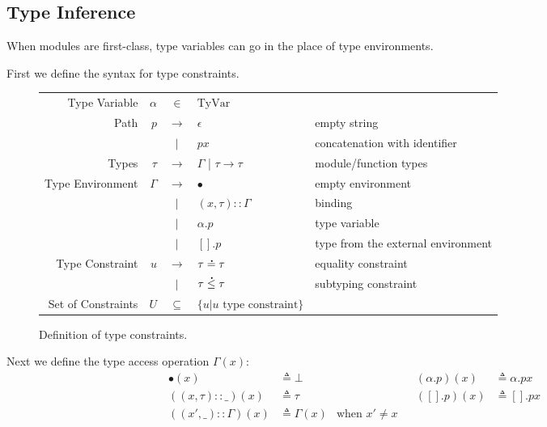 \documentclass{article}
\theoremstyle{definition}
\newcommand*{\vbar}{|}
\newcommand*{\cons}{::}
\newcommand*{\A}[1]{\overset{\,_{\mbox{\Large .}}}{#1}}
\newcommand*{\TyVar}{\text{TyVar}}
\begin{document}
\subsection{Type Inference}

When modules are first-class, type variables can go in the place of type environments.

First we define the syntax for type constraints.
\begin{figure}[h!]
  \centering
  \begin{tabular}{rrcll}
    Type Variable      & $\alpha$ & $\in$         & $\TyVar$                                                              \\
    Path               & $p$      & $\rightarrow$ & $\epsilon$                       & empty string                       \\
                       &          & $\vbar$       & $p x$                            & concatenation with identifier      \\
    Types              & $\tau$   & $\rightarrow$ & $\Gamma$ | $\tau\rightarrow\tau$ & module/function types              \\
    Type Environment   & $\Gamma$ & $\rightarrow$ & $\bullet$                        & empty environment                  \\
                       &          & $\vbar$       & $(x,\tau)\cons \Gamma$           & binding                            \\
                       &          & $\vbar$       & $\alpha.p$                       & type variable                      \\
                       &          & $\vbar$       & $[].p$                           & type from the external environment \\
    Type Constraint    & $u$      & $\rightarrow$ & $\tau\A{=}\tau$                  & equality constraint                \\
                       &          & $\vbar$       & $\tau\A{\le}\tau$                & subtyping constraint               \\
    Set of Constraints & $U$      & $\subseteq$   & $\{u|u\text{ type constraint}\}$
  \end{tabular}
  \caption{Definition of type constraints.}
  \label{fig:typeqdom}
\end{figure}

Next we define the type access operation $\Gamma(x)$:
\begin{align*}
  \bullet(x)              & \triangleq\bot      &                      &  & (\alpha.p)(x) & \triangleq\alpha.px \\
  ((x,\tau)\cons\_)(x)    & \triangleq\tau      &                      &  & ([].p)(x)     & \triangleq[].px     \\
  ((x',\_)\cons\Gamma)(x) & \triangleq\Gamma(x) & \text{when }x'\neq x
\end{align*}
\end{document}
